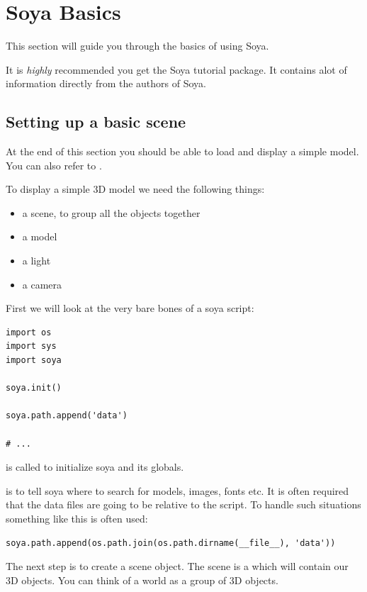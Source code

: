 \section{Soya Basics}
This section will guide you through the basics of using Soya. 

\begin{notice}
It is \emph{highly} recommended you get the Soya tutorial package. It contains
alot of information directly from the authors of Soya. 
\end{notice}

\subsection{Setting up a basic scene}
At the end of this section you should be able to load and display a simple model. 
You can also refer to .

To display a simple 3D model we need the following things:
\begin{itemize}
  \item a scene, to group all the objects together
  \item a model
  \item a light
  \item a camera
\end{itemize}

First we will look at the very bare bones of a soya script:
\begin{verbatim}
import os
import sys
import soya

soya.init()

soya.path.append('data')

# ...
\end{verbatim}

 is called to initialize soya and its globals. 

 is to tell soya where to search for models,
images, fonts etc. It is often required that the data files are going 
to be relative to the script. To handle such situations something like this is
often used:

\begin{verbatim}
soya.path.append(os.path.join(os.path.dirname(__file__), 'data'))
\end{verbatim}

The next step is to create a scene object. The scene is a 
which will contain our 3D objects. You can think of a world as a group of 3D
objects. 

